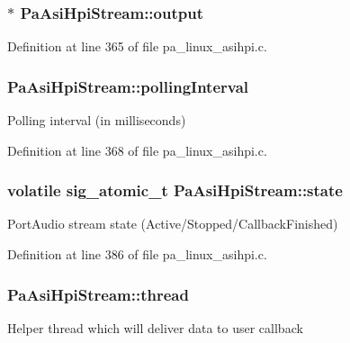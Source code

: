 \subsubsection[{\texorpdfstring{output}{output}}]{ $\ast$ Pa\+Asi\+Hpi\+Stream\+::output}\hypertarget{struct_pa_asi_hpi_stream_aafbaf53953d492ea86a8a80159860974}{}\label{struct_pa_asi_hpi_stream_aafbaf53953d492ea86a8a80159860974}


Definition at line 365 of file pa\+\_\+linux\+\_\+asihpi.\+c.

\subsubsection[{\texorpdfstring{polling\+Interval}{pollingInterval}}]{ Pa\+Asi\+Hpi\+Stream\+::polling\+Interval}\hypertarget{struct_pa_asi_hpi_stream_aef07ecb3b6d4d1dcb1669d4e3925ebdb}{}\label{struct_pa_asi_hpi_stream_aef07ecb3b6d4d1dcb1669d4e3925ebdb}
Polling interval (in milliseconds) 

Definition at line 368 of file pa\+\_\+linux\+\_\+asihpi.\+c.

\subsubsection[{\texorpdfstring{state}{state}}]{\setlength{\rightskip}{0pt plus 5cm}volatile sig\+\_\+atomic\+\_\+t Pa\+Asi\+Hpi\+Stream\+::state}\hypertarget{struct_pa_asi_hpi_stream_a3d0fb974d92bab23a1f2eab9519e4e08}{}\label{struct_pa_asi_hpi_stream_a3d0fb974d92bab23a1f2eab9519e4e08}
Port\+Audio stream state (Active/\+Stopped/\+Callback\+Finished) 

Definition at line 386 of file pa\+\_\+linux\+\_\+asihpi.\+c.

\subsubsection[{\texorpdfstring{thread}{thread}}]{ Pa\+Asi\+Hpi\+Stream\+::thread}\hypertarget{struct_pa_asi_hpi_stream_ab1b5110d6b838483c92f1e914da6abee}{}\label{struct_pa_asi_hpi_stream_ab1b5110d6b838483c92f1e914da6abee}
Helper thread which will deliver data to user callback 

